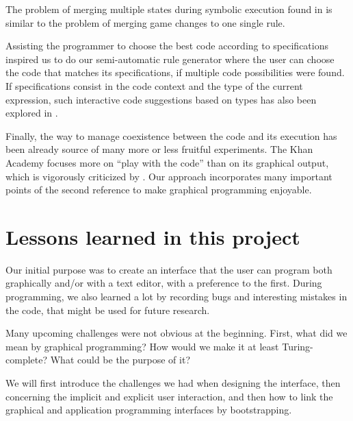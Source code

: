 \documentclass[12pt]{article} %
\begin{document}
The problem of merging
multiple states during symbolic execution found in
\cite{kuznetsov_efficient_2012} is similar to the problem of merging game
changes to one single rule.

Assisting the programmer to choose the best code according to specifications
\cite{shacham_chameleon:_2009} inspired us to do our semi-automatic rule
generator where the user can choose the code that matches its specifications, if
multiple code possibilities were found. If specifications consist in the
code context and the type of the current expression, such
interactive code suggestions based on types has also been explored in
\cite{gvero_interactive_2011}.

Finally, the way to manage coexistence between the code and its execution
has been already source of many more or less fruitful experiments. The
Khan Academy
\cite{sal_khan_2012} focuses more on ``play with the code'' than on its graphical
output, which is vigorously criticized by \cite{bret_learnable_2012}. Our approach
incorporates many important points of the second reference to make graphical
programming enjoyable.



\section{Lessons learned in this project}
Our initial purpose was to create an interface that the user can program
both graphically and/or with a text editor, with a preference to the first.
During programming, we also learned a lot by recording bugs and interesting
mistakes in the code, that might be used for future research.

Many upcoming challenges were not obvious at the beginning. First, what did we
mean by graphical programming? How would we make it at least Turing-complete?
What could be the purpose of it?

We will first introduce the challenges we had when designing the interface, then
concerning the implicit and explicit user interaction, and then how to link the
graphical and application programming interfaces by bootstrapping.
\end{document}
